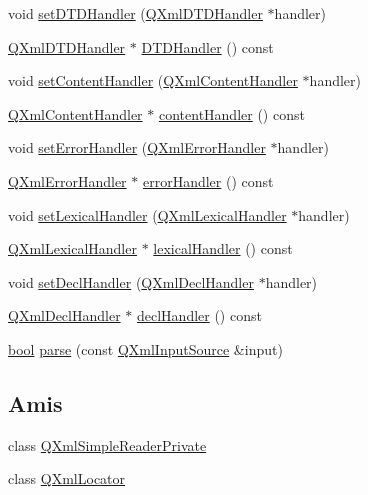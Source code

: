 \begin{DoxyCompactItemize}
\item 
void \hyperlink{class_q_xml_simple_reader_a48b3b2f31a8e0436049fa13072b3bec7}{set\+D\+T\+D\+Handler} (\hyperlink{class_q_xml_d_t_d_handler}{Q\+Xml\+D\+T\+D\+Handler} $\ast$handler)
\item 
\hyperlink{class_q_xml_d_t_d_handler}{Q\+Xml\+D\+T\+D\+Handler} $\ast$ \hyperlink{class_q_xml_simple_reader_ad92bd3b24ba5f0f0dcd5a71c80367576}{D\+T\+D\+Handler} () const 
\item 
void \hyperlink{class_q_xml_simple_reader_ae3561b9c7507e03b87534f505fec2857}{set\+Content\+Handler} (\hyperlink{class_q_xml_content_handler}{Q\+Xml\+Content\+Handler} $\ast$handler)
\item 
\hyperlink{class_q_xml_content_handler}{Q\+Xml\+Content\+Handler} $\ast$ \hyperlink{class_q_xml_simple_reader_a43284b7f12405000a44ae1dc9efa62ca}{content\+Handler} () const 
\item 
void \hyperlink{class_q_xml_simple_reader_a2c660f128d0820723138e4e0af5b9dcb}{set\+Error\+Handler} (\hyperlink{class_q_xml_error_handler}{Q\+Xml\+Error\+Handler} $\ast$handler)
\item 
\hyperlink{class_q_xml_error_handler}{Q\+Xml\+Error\+Handler} $\ast$ \hyperlink{class_q_xml_simple_reader_ad13093a6fc9d3d34c73036ae9a074a2f}{error\+Handler} () const 
\item 
void \hyperlink{class_q_xml_simple_reader_ad8788962913e2eaeaf18a8124fb1b770}{set\+Lexical\+Handler} (\hyperlink{class_q_xml_lexical_handler}{Q\+Xml\+Lexical\+Handler} $\ast$handler)
\item 
\hyperlink{class_q_xml_lexical_handler}{Q\+Xml\+Lexical\+Handler} $\ast$ \hyperlink{class_q_xml_simple_reader_aa727adbd20663e4c6bb82e9a3495cfc1}{lexical\+Handler} () const 
\item 
void \hyperlink{class_q_xml_simple_reader_ace5ca778d4b51af1883a8d72a99fb436}{set\+Decl\+Handler} (\hyperlink{class_q_xml_decl_handler}{Q\+Xml\+Decl\+Handler} $\ast$handler)
\item 
\hyperlink{class_q_xml_decl_handler}{Q\+Xml\+Decl\+Handler} $\ast$ \hyperlink{class_q_xml_simple_reader_a0930e3ad3a973cc291d56999c660c8dd}{decl\+Handler} () const 
\item 
\hyperlink{qglobal_8h_a1062901a7428fdd9c7f180f5e01ea056}{bool} \hyperlink{class_q_xml_simple_reader_a664631907374b7d0f7b492ef65f418d9}{parse} (const \hyperlink{class_q_xml_input_source}{Q\+Xml\+Input\+Source} \&input)
\end{DoxyCompactItemize}
\subsection*{Amis}
\begin{DoxyCompactItemize}
\item 
class \hyperlink{class_q_xml_simple_reader_a2ff4a58652c4931df003d69975caa9f2}{Q\+Xml\+Simple\+Reader\+Private}
\item 
class \hyperlink{class_q_xml_simple_reader_a719c6d0688866ca5c61250f04fc80ca9}{Q\+Xml\+Locator}
\end{DoxyCompactItemize}


